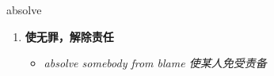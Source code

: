 
\begin{frame}
{\huge absolve}
\begin{center}
\begin{enumerate}\Large
  \item \textbf{使无罪，解除责任}
  \begin{itemize}
    \item \em{\Large{absolve somebody from blame 使某人免受责备}}
  \end{itemize}
\end{enumerate}
\end{center}
\end{frame}
